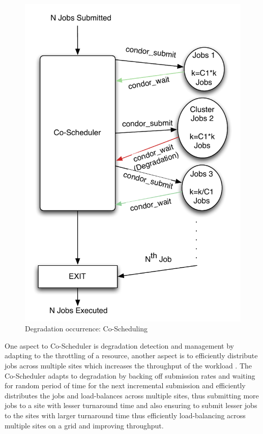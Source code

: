 \documentclass[ms,electronic,double]{nuthesis}
\begin{document}
\begin{figure}[htbp!]
\begin{center}
\includegraphics[scale=0.75]{images/degradation_detection}
\caption{Degradation occurrence: Co-Scheduling}
\label{fig:degradationdetect-intro}
\end{center}
\end{figure}

One aspect to Co-Scheduler is degradation detection and management by adapting 
to the throttling of a resource, another aspect is to efficiently distribute jobs 
across multiple sites which increases the throughput of the workload
. The Co-Scheduler adapts to degradation by backing off submission rates and waiting for random
period of time for the next incremental submission and efficiently 
distributes the jobs and load-balances across multiple sites, thus submitting more 
jobs to a site with lesser turnaround time and also ensuring to submit lesser 
jobs to the sites with larger turnaround time thus efficiently load-balancing 
across multiple sites on a grid and improving throughput.
\end{document}
